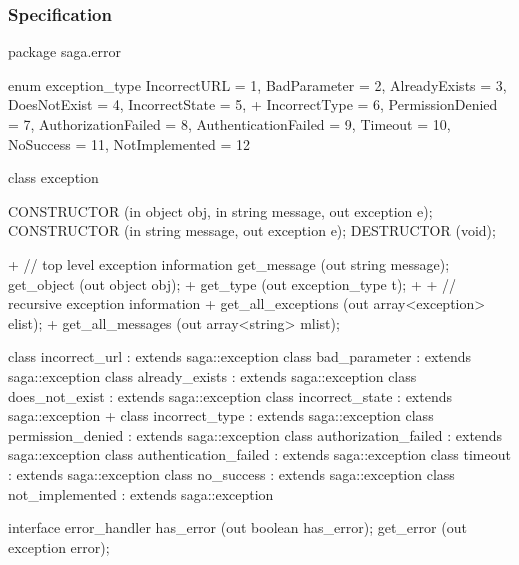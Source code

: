  
 \newpage
 
 \subsubsection{Specification}
 
 \begin{myspec}
  package saga.error
  {
    enum exception_type
    {
      IncorrectURL         =  1,
      BadParameter         =  2,
      AlreadyExists        =  3,
      DoesNotExist         =  4,
      IncorrectState       =  5,
+     IncorrectType        =  6,
      PermissionDenied     =  7,
      AuthorizationFailed  =  8,
      AuthenticationFailed =  9,
      Timeout              = 10,
      NoSuccess            = 11,
      NotImplemented       = 12
    }

    class exception
    {
      CONSTRUCTOR          (in  object           obj,
                            in  string           message,
                            out exception        e);
      CONSTRUCTOR          (in  string           message,
                            out exception        e);
      DESTRUCTOR           (void);
 
+     // top level exception information
      get_message          (out string           message);
      get_object           (out object           obj);
+     get_type             (out exception_type   t);
+
+     // recursive exception information
+     get_all_exceptions   (out array<exception> elist);
+     get_all_messages     (out array<string>    mlist);
    }
 
    class incorrect_url         : extends saga::exception { }
    class bad_parameter         : extends saga::exception { }
    class already_exists        : extends saga::exception { }
    class does_not_exist        : extends saga::exception { }
    class incorrect_state       : extends saga::exception { }
+   class incorrect_type        : extends saga::exception { }
    class permission_denied     : extends saga::exception { }
    class authorization_failed  : extends saga::exception { }
    class authentication_failed : extends saga::exception { }
    class timeout               : extends saga::exception { }
    class no_success            : extends saga::exception { }
    class not_implemented       : extends saga::exception { }
 
 
    interface error_handler
    {
      has_error            (out boolean        has_error);
      get_error            (out exception      error);
    }
  }
 \end{myspec}
 

